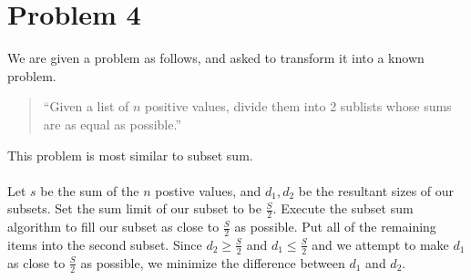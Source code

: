 \section*{Problem 4}

We are given a problem as follows, and asked to transform it into a known 
problem.
\begin{quote}
``Given a list of $n$ positive values, divide them into 2 sublists whose sums are as equal as possible.''
\end{quote}
This problem is most similar to subset sum.
\\
\\
Let $s$ be the sum of the $n$ postive values, and $d_1,d_2$ be the resultant 
sizes of our subsets.
Set the sum limit of our subset to be $\frac{S}{2}$. Execute the subset sum 
algorithm to fill our 
subset as close to $\frac{S}{2}$ as possible. Put all of the remaining items 
into the second subset. 
Since $d_2 \ge \frac{S}{2}$ and $d_1 \le \frac{S}{2}$ and we attempt to make 
$d_1$ as close to 
$\frac{S}{2}$ as possible, we minimize the difference between $d_1$ and $d_2$.
